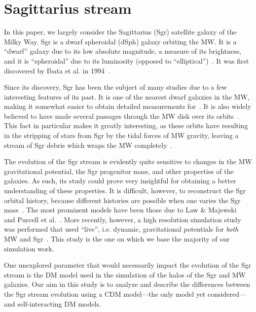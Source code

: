\section{Sagittarius stream}
In this paper, we largely consider the Sagittarius (Sgr) satellite galaxy of
the Milky Way. Sgr is a dwarf spheroidal (dSph) galaxy orbiting the MW. It is
a ``dwarf'' galaxy due to its low absolute magnitude, a measure of its
brightness, and it is ``spheroidal'' due to its luminosity (opposed to
``elliptical'')~\cite{mcconnachie_observed_2012}. It was first discovered by
Ibata et al. in 1994~\cite{ibata_dwarf_1994}.

Since its discovery, Sgr has been the subject of many studies due to a few
interesting features of its past. It is one of the nearest dwarf galaxies in
the MW, making it somewhat easier to obtain detailed measurements
for~\cite{kunder_distance_2009}. It is also widely believed to have made
several passages through the MW disk over its
orbits~\cite{purcell_sagittarius_2011}. This fact in particular makes it
greatly interesting, as these orbits have resulting in the stripping of stars
from Sgr by the tidal forces of MW gravity, leaving a stream of Sgr debris
which wraps the MW completely~\cite{purcell_sagittarius_2011,
law_sagittarius_2010}.

The evolution of the Sgr stream is evidently quite sensitive to changes in
the MW gravitational potential, the Sgr progenitor mass, and other properties
of the galaxies. As such, its study could prove very insightful for obtaining
a better understanding of these properties. It is difficult, however, to
reconstruct the Sgr orbital history, because different histories are possible
when one varies the Sgr mass~\cite{jiang_orbit_2000}. The most prominent
models have been those due to Law \& Majewski~\cite{law_sagittarius_2010} and
Purcell et al.~\cite{purcell_sagittarius_2011}. More recently, however, a
high resolution simulation study was performed that used ``live'', i.e.
dynamic, gravitational potentials for \textit{both} MW and
Sgr~\cite{dierickx_predicted_2017}. This study is the one on which we base
the majority of our simulation work.

One unexplored parameter that would necessarily impact the evolution of the Sgr
stream is the DM model used in the simulation of the halos of the Sgr and MW
galaxies. Our aim in this study is to analyze and describe the differences
between the Sgr stream evolution using a CDM model---the only model yet
considered---and self-interacting DM models. 
